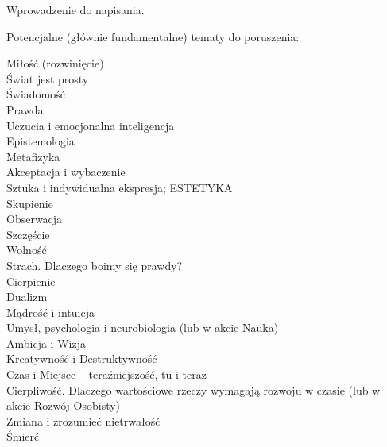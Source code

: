 Wprowadzenie do napisania.

\vin Potencjalne (głównie fundamentalne) tematy do poruszenia:

Miłość (rozwinięcie) \\
Świat jest prosty \\
Świadomość \\
Prawda \\
Uczucia i emocjonalna inteligencja \\
Epistemologia \\
Metafizyka \\
Akceptacja i wybaczenie \\
Sztuka i indywidualna ekspresja; ESTETYKA \\
Skupienie \\
Obserwacja \\
Szczęście \\
Wolność \\
Strach. Dlaczego boimy się prawdy? \\
Cierpienie \\
Dualizm \\
Mądrość i intuicja \\
Umysł, psychologia i neurobiologia (lub w akcie Nauka) \\
Ambicja i Wizja \\
Kreatywność i Destruktywność \\
Czas i Miejsce -- teraźniejszość, tu i teraz \\
Cierpliwość. Dlaczego wartościowe rzeczy wymagają rozwoju w czasie (lub w akcie Rozwój Osobisty) \\
Zmiana i zrozumieć nietrwałość \\
Śmierć
